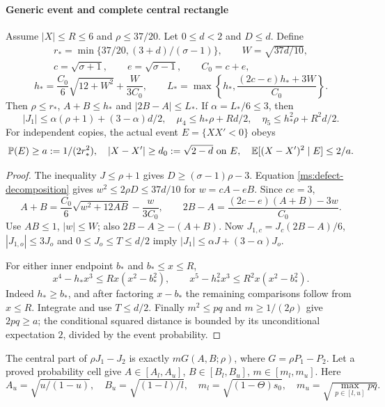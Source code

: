 \paragraph{Generic event and complete central rectangle}
\begin{lemma}\label{ms:fourier:rescore:entry201-event}\label{ms:fourier:rescore:mom-third}
Assume $|X|\le R\le6$ and $\rho\le37/20$. Let $0\le d<2$ and $D\le d$. Define
\[
\begin{gathered}
 r_*=\min\{37/20,(3+d)/(\sigma-1)\},\qquad W=\sqrt{37d/10},\\
 c=\sqrt{\sigma+1},\qquad e=\sqrt{\sigma-1},\qquad C_0=c+e,
\end{gathered}
\]
\[
 h_*=\frac{C_0}{6}\sqrt{12+W^2}+\frac{W}{3C_0},\qquad
 L_*=\max\left\{h_*,\frac{(2c-e)h_*+3W}{C_0}\right\}.
\]
Then $\rho\le r_*$, $A+B\le h_*$ and $|2B-A|\le L_*$.
If $\alpha=L_*/6\le3$, then
\[
 |J_1|\le\alpha(\rho+1)+(3-\alpha)d/2,\quad
 \mu_4\le h_*\rho+Rd/2,\quad
 \eta_5\le h_*^2\rho+R^2d/2.
\]
For independent copies, the actual event $E=\{XX'<0\}$ obeys
\[
 \mathbb P(E)\ge a:=1/(2r_*^2),\quad
 |X-X'|\ge d_0:=\sqrt{2-d}\text{ on }E,\quad
 \mathbb E[(X-X')^2\mid E]\le2/a.
\]
\end{lemma}
\begin{proof}
The inequality $J\le\rho+1$ gives $D\ge(\sigma-1)\rho-3$.
Equation \eqref{ms:defect-decomposition} gives $w^2\le2\rho D\le37d/10$ for
$w=cA-eB$. Since $ce=3$,
\[
 A+B=\frac{C_0}{6}\sqrt{w^2+12AB}-\frac{w}{3C_0},
 \qquad 2B-A=\frac{(2c-e)(A+B)-3w}{C_0}.
\]
Use $AB\le1$, $|w|\le W$; also $2B-A\ge-(A+B)$.
Now $J_{1,c}=J_c(2B-A)/6$, $|J_{1,o}|\le3J_o$ and
$0\le J_o\le T\le d/2$ imply
$|J_1|\le\alpha J+(3-\alpha)J_o$.

For either inner endpoint $b_*$ and $b_*\le x\le R$,
\[
 x^4-h_*x^3\le R x(x^2-b_*^2),\qquad
 x^5-h_*^2x^3\le R^2x(x^2-b_*^2).
\]
Indeed $h_*\ge b_*$, and after factoring $x-b_*$ the remaining
comparisons follow from $x\le R$. Integrate and use $T\le d/2$.
Finally $m^2\le pq$ and $m\ge1/(2\rho)$ give $2pq\ge a$;
the conditional squared distance is bounded by its unconditional
expectation $2$, divided by the event probability.
\end{proof}

The central part of $\rho J_1-J_2$ is exactly
$mG(A,B;\rho)$, where $G=\rho P_1-P_2$.
Let a proved probability cell give
$A\in[A_l,A_u]$, $B\in[B_l,B_u]$, $m\in[m_l,m_u]$.
Here
\[
 A_u=\sqrt{u/(1-u)},\quad B_u=\sqrt{(1-l)/l},\quad
 m_l=\sqrt{(1-\Theta)s_0},\quad
 m_u=\sqrt{\max_{p\in[l,u]}pq}.
\]

